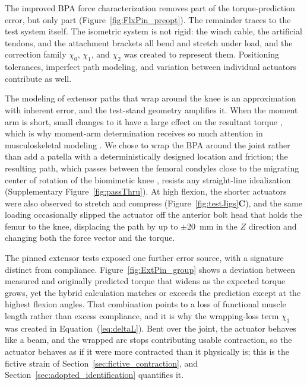 \documentclass[utf8]{FrontiersinHarvard} %
\begin{document}
The improved BPA force characterization removes part of the torque-prediction error, but only part (Figure~\ref{fig:FlxPin_preopt}). The remainder traces to the test system itself. The isometric system is not rigid: the winch cable, the artificial tendons, and the attachment brackets all bend and stretch under load, and the correction family $\chi_{0}$, $\chi_{1}$, and $\chi_{2}$ was created to represent them. Positioning tolerances, imperfect path modeling, and variation between individual actuators contribute as well.

The modeling of extensor paths that wrap around the knee is an approximation with inherent error, and the test-stand geometry amplifies it. When the moment arm is short, small changes to it have a large effect on the resultant torque \citep{young_analyzing_2019}, which is why moment-arm determination receives so much attention in musculoskeletal modeling \citep{brand_model_1982, menegaldo_moment_2004, suderman_moving_2012}. We chose to wrap the BPA around the joint rather than add a patella with a deterministically designed location and friction; the resulting path, which passes between the femoral condyles close to the migrating center of rotation of the biomimetic knee \citep{steele_biomimetic_2018}, resists any straight-line idealization (Supplementary Figure~\ref{fig:passThru}). At high flexion, the shorter actuators were also observed to stretch and compress (Figure~\ref{fig:testJigs}\textbf{C}), and the same loading occasionally slipped the actuator off the anterior bolt head that holds the femur to the knee, displacing the path by up to $\pm$\qty{20}{\mm} in the $Z$ direction and changing both the force vector and the torque.

The pinned extensor tests exposed one further error source, with a signature distinct from compliance. Figure~\ref{fig:ExtPin_group} shows a deviation between measured and originally predicted torque that widens as the expected torque grows, yet the hybrid calculation matches or exceeds the prediction except at the highest flexion angles. That combination points to a loss of functional muscle length rather than excess compliance, and it is why the wrapping-loss term $\chi_{3}$ was created in Equation~(\ref{eq:deltaL}). Bent over the joint, the actuator behaves like a beam, and the wrapped arc stops contributing usable contraction, so the actuator behaves as if it were more contracted than it physically is; this is the fictive strain of Section~\ref{sec:fictive_contraction}, and Section~\ref{sec:adopted_identification} quantifies it.
\end{document}
